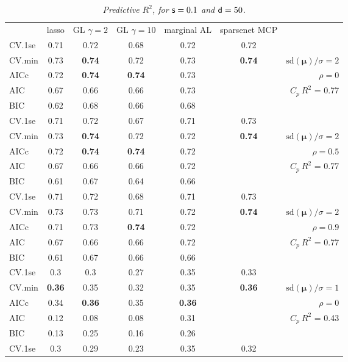 \documentclass[12pt]{article}
\newcommand{\mr}[1]{\mathrm{#1}}
\newcommand{\bm}[1]{\mathbf{#1}}
\begin{document}
\begin{table}[p]\vspace{-.5cm}
\caption[l]{\label{r2}\it Predictive $R^2$, for ${\sf s}=0.1$ and  ${\sf d}=50$.}
\vspace{-.5cm}
\small{}
\begin{center}
\begin{tabular}{l*{5}{c}|r}
 & lasso & GL $\gamma=2$ & GL $\gamma=10$ & marginal AL & sparsenet MCP  &  \\
\cline{1-7}
CV.1se & 0.71 & 0.72 & 0.68 & 0.72 & 0.72 &\\
CV.min & 0.73 & {\bf 0.74} & 0.72 & 0.73 & {\bf 0.74} &  $\mr{sd}(\bm{\mu})/\sigma=2$ \\
AICc & 0.72 & {\bf 0.74} & {\bf 0.74} & 0.73 & & $\rho=0$ \\
AIC & 0.67 & 0.66 & 0.66 & 0.73 & & \multirow{2}{*}{$C_p ~ R^2$ = 0.77} \\
BIC & 0.62 & 0.68 & 0.66 & 0.68 & & \\
 \hline 
CV.1se & 0.71 & 0.72 & 0.67 & 0.71 & 0.73 &\\
CV.min & 0.73 & {\bf 0.74} & 0.72 & 0.72 & {\bf 0.74} &  $\mr{sd}(\bm{\mu})/\sigma=2$ \\
AICc & 0.72 & {\bf 0.74} & {\bf 0.74} & 0.72 & & $\rho=0.5$ \\
AIC & 0.67 & 0.66 & 0.66 & 0.72 & & \multirow{2}{*}{$C_p ~ R^2$ = 0.77} \\
BIC & 0.61 & 0.67 & 0.64 & 0.66 & & \\
 \hline 
CV.1se & 0.71 & 0.72 & 0.68 & 0.71 & 0.73 &\\
CV.min & 0.73 & 0.73 & 0.71 & 0.72 & {\bf 0.74} &  $\mr{sd}(\bm{\mu})/\sigma=2$ \\
AICc & 0.71 & 0.73 & {\bf 0.74} & 0.72 & & $\rho=0.9$ \\
AIC & 0.67 & 0.66 & 0.66 & 0.72 & & \multirow{2}{*}{$C_p ~ R^2$ = 0.77} \\
BIC & 0.61 & 0.67 & 0.66 & 0.66 & & \\
 \hline 
CV.1se & 0.3 & 0.3 & 0.27 & 0.35 & 0.33 &\\
CV.min & {\bf 0.36} & 0.35 & 0.32 & 0.35 & {\bf 0.36} &  $\mr{sd}(\bm{\mu})/\sigma=1$ \\
AICc & 0.34 & {\bf 0.36} & 0.35 & {\bf 0.36} & & $\rho=0$ \\
AIC & 0.12 & 0.08 & 0.08 & 0.31 & & \multirow{2}{*}{$C_p ~ R^2$ = 0.43} \\
BIC & 0.13 & 0.25 & 0.16 & 0.26 & & \\
 \hline 
CV.1se & 0.3 & 0.29 & 0.23 & 0.35 & 0.32 &\\

\end{tabular}
\end{center}
\end{table}
\end{document}
